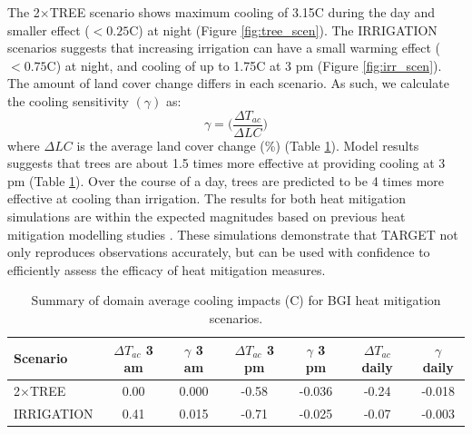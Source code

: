 \documentclass[gmd, manuscript]{copernicus}
\begin{document}
The 2$\times$TREE scenario  shows maximum cooling of  3.15\degree C during the day and smaller effect ($< 0.25$\degree C) at night (Figure \ref{fig:tree_scen}).  The IRRIGATION scenarios suggests that increasing irrigation can have a small warming effect ($< 0.75$\degree C) at night, and  cooling of up to  1.75\degree C at 3 pm (Figure \ref{fig:irr_scen}).  The amount of  land cover change differs in each scenario. As such, we calculate the cooling sensitivity $(\gamma)$ as:
\begin{equation}
\gamma = \big(\frac{\Delta T_{ac}}{\Delta LC}\big)
\end{equation}where $\Delta LC$ is the average land cover change (\%) (Table \ref{tab:cooling_scen}). Model results suggests that trees  are about 1.5 times more effective at providing cooling at 3 pm (Table \ref{tab:cooling_scen}). Over the course of a day, trees are predicted to be 4 times more effective at cooling than irrigation. The results for both heat mitigation simulations are  within the expected magnitudes based on previous heat mitigation modelling studies \citep{grossman2010,middel2015urban,daniel2016,Broadbent}. These simulations demonstrate that TARGET not only reproduces observations accurately, but can be used with confidence to efficiently assess the efficacy of heat mitigation measures.   

\begin{table}
\begin{center}
\caption{Summary of domain average cooling impacts (\degree C) for BGI heat mitigation scenarios.}
\label{tab:cooling_scen}
\begin{tabular}{l | c c | c c | c c}
\hline
Scenario & $\Delta T_{ac}$ 3 am & $\gamma$ 3 am & $\Delta T_{ac}$ 3 pm &  $\gamma$ 3 pm & $\Delta T_{ac}$ daily  & $\gamma$ daily \\
\hline
2$\times$TREE & 0.00 & 0.000 & -0.58 & -0.036 & -0.24 & -0.018   \\
IRRIGATION    & 0.41  & 0.015 & -0.71 & -0.025 & -0.07 & -0.003  \\
\hline
\end{tabular}

\end{center}
\end{table}
\end{document}

